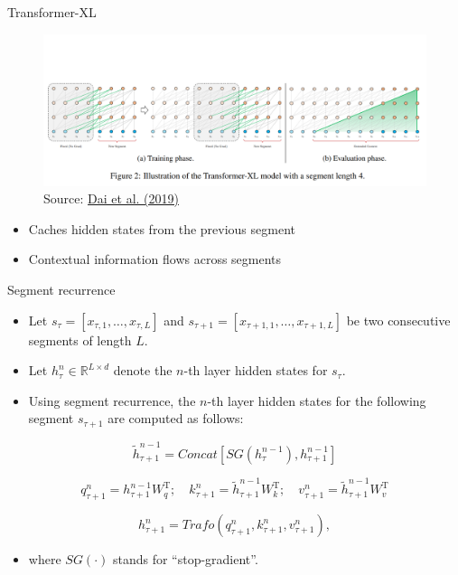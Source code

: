 
\begin{vbframe}{Transformer-XL}

\begin{figure}
\centering
\includegraphics[width = 11.5cm]{figure/trafo-xl-seq4.png}\\ 
\footnotesize{Source:} \href{https://aclanthology.org/P19-1285.pdf}{\footnotesize Dai et al. (2019)}
\end{figure}

\begin{itemize}
		\item Caches hidden states from the previous segment
		\item Contextual information flows across segments
\end{itemize}

\end{vbframe}


\begin{vbframe}{Segment recurrence}

\begin{itemize}
		\item Let $s_\tau = [x_{\tau,1}, \hdots, x_{\tau,L}]$ and $s_{\tau+1} = [x_{\tau+1,1}, \hdots, x_{\tau+1,L}]$ be two consecutive segments of length $L$.
		\item Let $h_\tau^n \in \mathds{R}^{L\times d}$ denote the $n$-th layer hidden states for $s_\tau$.
		\item Using segment recurrence, the $n$-th layer hidden states for the following segment $s_{\tau+1}$ are computed as follows:
\end{itemize}

$$\tilde{h}_{\tau+1}^{n-1} = Concat[SG(h_{\tau}^{n-1}), h_{\tau+1}^{n-1}]$$

$$q_{\tau+1}^{n} = h_{\tau+1}^{n-1}W^\text{T}_q; \quad k_{\tau+1}^{n} = \tilde{h}_{\tau+1}^{n-1}W^\text{T}_k; \quad v_{\tau+1}^{n} = \tilde{h}_{\tau+1}^{n-1}W^\text{T}_v$$

$$h_{\tau+1}^{n} = Trafo(q_{\tau+1}^{n}, k_{\tau+1}^{n}, v_{\tau+1}^{n}),$$

\begin{itemize}
		\item[] where $SG(\cdot)$ stands for "`stop-gradient"'.
\end{itemize}

\end{vbframe}

